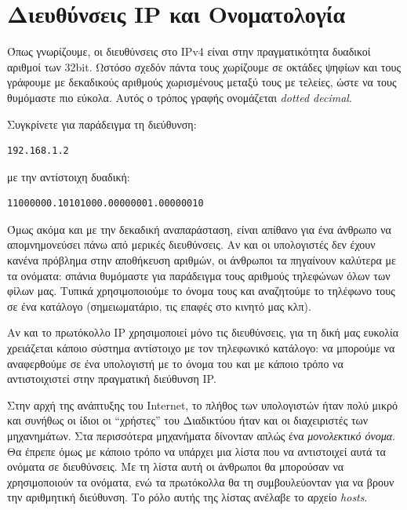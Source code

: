 %
%
\section{Διευθύνσεις IP και Ονοματολογία}

Όπως γνωρίζουμε, οι διευθύνσεις στο IPv4 είναι στην πραγματικότητα δυαδικοί αριθμοί των 32bit.  Ωστόσο σχεδόν πάντα τους χωρίζουμε σε οκτάδες ψηφίων και τους γράφουμε με δεκαδικούς αριθμούς χωρισμένους μεταξύ τους με τελείες, ώστε να τους θυμόμαστε πιο εύκολα. Αυτός ο τρόπος γραφής ονομάζεται \emph{dotted decimal}.

Συγκρίνετε για παράδειγμα τη διεύθυνση:

\begin{center}
\begin{verbatim}
192.168.1.2
\end{verbatim}
\end{center}

με την αντίστοιχη δυαδική:

\begin{center}
\begin{verbatim}
‭11000000‬.‭10101000‬.00000001.00000010
\end{verbatim}
\end{center}

Όμως ακόμα και με την δεκαδική αναπαράσταση, είναι απίθανο για ένα άνθρωπο να απομνημονεύσει πάνω από μερικές διευθύνσεις. Αν και οι υπολογιστές δεν έχουν κανένα πρόβλημα στην αποθήκευση αριθμών, οι άνθρωποι τα πηγαίνουν καλύτερα με τα ονόματα: σπάνια θυμόμαστε για παράδειγμα τους αριθμούς τηλεφώνων όλων των φίλων μας. Τυπικά χρησιμοποιούμε το όνομα τους και αναζητούμε το τηλέφωνο τους σε ένα κατάλογο (σημειωματάριο, τις επαφές στο κινητό μας κλπ). 

Αν και το πρωτόκολλο IP χρησιμοποιεί μόνο τις διευθύνσεις, για τη δική μας ευκολία χρειάζεται κάποιο σύστημα αντίστοιχο με τον τηλεφωνικό κατάλογο: να μπορούμε να αναφερθούμε σε ένα υπολογιστή με το όνομα του και με κάποιο τρόπο να αντιστοιχιστεί στην πραγματική διεύθυνση IP.

Στην αρχή της ανάπτυξης του Internet, το πλήθος των υπολογιστών ήταν πολύ μικρό και συνήθως οι ίδιοι οι ``χρήστες'' του Διαδικτύου ήταν και οι διαχειριστές των μηχανημάτων. Στα περισσότερα μηχανήματα δίνονταν απλώς ένα \emph{μονολεκτικό όνομα}. Θα έπρεπε όμως με κάποιο τρόπο να υπάρχει μια λίστα που να αντιστοιχεί αυτά τα ονόματα σε διευθύνσεις. Με τη λίστα αυτή οι άνθρωποι θα μπορούσαν να χρησιμοποιούν τα ονόματα, ενώ τα πρωτόκολλα θα τη συμβουλεύονταν για να βρουν την αριθμητική διεύθυνση. Το ρόλο αυτής της λίστας ανέλαβε το αρχείο \emph{hosts}.

